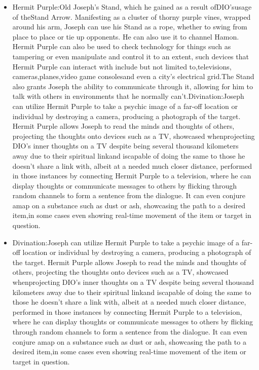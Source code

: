 \documentclass[a4paper,12pt]{article}
\begin{document}
\begin{itemize}
\item Hermit Purple:Old Joseph's Stand, which he gained as a result ofDIO'susage of theStand Arrow. Manifesting as a cluster of thorny purple vines, wrapped around his arm, Joseph can use his Stand as a rope, whether to swing from place to place or tie up opponents. He can also use it to channel Hamon. Hermit Purple can also be used to check technology for things such as tampering or even manipulate and control it to an extent, such devices that Hermit Purple can interact with include but not limited to,televisions, cameras,planes,video game consolesand even a city's electrical grid.The Stand also grants Joseph the ability to communicate through it, allowing for him to talk with others in environments that he normally can't.Divination:Joseph can utilize Hermit Purple to take a psychic image of a far-off location or individual by destroying a camera, producing a photograph of the target. Hermit Purple allows Joseph to read the minds and thoughts of others, projecting the thoughts onto devices such as a TV, showcased whenprojecting DIO's inner thoughts on a TV despite being several thousand kilometers away due to their spiritual linkand iscapable of doing the same to those he doesn't share a link with, albeit at a needed much closer distance, performed in those instances by connecting Hermit Purple to a television, where he can display thoughts or communicate messages to others by flicking through random channels to form a sentence from the dialogue. It can even conjure amap on a substance such as dust or ash, showcasing the path to a desired item,in some cases even showing real-time movement of the item or target in question.
\item Divination:Joseph can utilize Hermit Purple to take a psychic image of a far-off location or individual by destroying a camera, producing a photograph of the target. Hermit Purple allows Joseph to read the minds and thoughts of others, projecting the thoughts onto devices such as a TV, showcased whenprojecting DIO's inner thoughts on a TV despite being several thousand kilometers away due to their spiritual linkand iscapable of doing the same to those he doesn't share a link with, albeit at a needed much closer distance, performed in those instances by connecting Hermit Purple to a television, where he can display thoughts or communicate messages to others by flicking through random channels to form a sentence from the dialogue. It can even conjure amap on a substance such as dust or ash, showcasing the path to a desired item,in some cases even showing real-time movement of the item or target in question.

\end{itemize}
\end{document}
